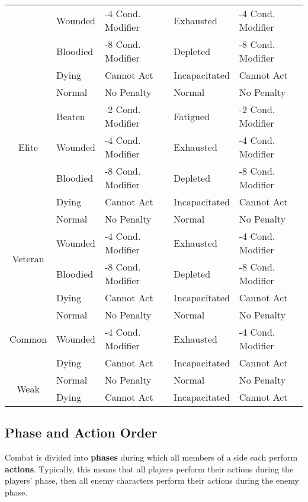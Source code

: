 \documentclass[11pt]{article}
\begin{document}
\begin{center}
\begin{tabular}{cllll}
		 & Wounded  & -4  Cond. Modifier & Exhausted     & -4  Cond. Modifier \\
		 & Bloodied & -8  Cond. Modifier & Depleted      & -8  Cond. Modifier \\
		 & Dying    & Cannot Act              & Incapacitated & Cannot Act              \\
		\hline
		\multirow{5}{*}{Elite}
		 & Normal   & No Penalty              & Normal        & No Penalty              \\
		 & Beaten   & -2  Cond. Modifier & Fatigued      & -2  Cond. Modifier \\
		 & Wounded  & -4  Cond. Modifier & Exhausted     & -4  Cond. Modifier \\
		 & Bloodied & -8  Cond. Modifier & Depleted      & -8  Cond. Modifier \\
		 & Dying    & Cannot Act              & Incapacitated & Cannot Act              \\
		\hline
		\multirow{4}{*}{Veteran}
		 & Normal   & No Penalty              & Normal        & No Penalty              \\
		 & Wounded  & -4  Cond. Modifier & Exhausted     & -4  Cond. Modifier \\
		 & Bloodied & -8  Cond. Modifier & Depleted      & -8  Cond. Modifier \\
		 & Dying    & Cannot Act              & Incapacitated & Cannot Act              \\
		\hline
		\multirow{3}{*}{Common}
		 & Normal   & No Penalty              & Normal        & No Penalty              \\
		 & Wounded  & -4  Cond. Modifier & Exhausted     & -4  Cond. Modifier \\
		 & Dying    & Cannot Act              & Incapacitated & Cannot Act              \\
		\hline
		\multirow{2}{*}{Weak}
		 & Normal   & No Penalty              & Normal        & No Penalty              \\
		 & Dying    & Cannot Act              & Incapacitated & Cannot Act              \\
		\hline
	\end{tabular}
\end{center}
\newpage

\subsection{Phase and Action Order}
Combat is divided into \textbf{phases} during which all members of a side each perform \textbf{actions}.
Typically, this means that all players perform their actions during the players' phase, then all enemy characters perform their actions during the enemy phase.
\end{document}
